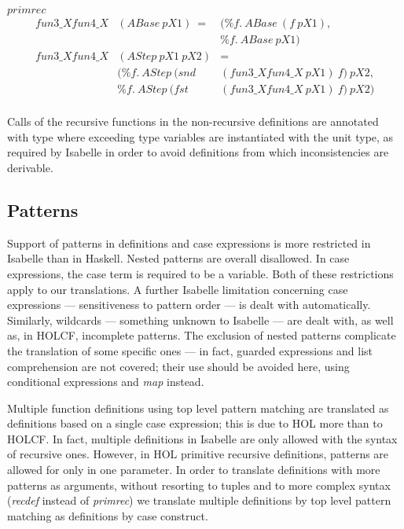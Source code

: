\documentclass[a4paper,12pt]{article}
\begin{document}
\noindent $primrec$ 
$$\begin{array}{lll}
fun3\_Xfun4\_X & (ABase \ pX1) \ = & (\% f. \ ABase \ (f \ pX1), \\
                           &        &  \% f. \ ABase \ pX1) \\
fun3\_Xfun4\_X & (AStep \ pX1 \ pX2) & =  \\
  & (\% f. \ AStep \ (snd & (fun3\_Xfun4\_X \ pX1) \ f) \ pX2, \\
  &  \% f. \ AStep \ (fst & (fun3\_Xfun4\_X \ pX1) \ f) \ pX2) \\
\end{array}$$

\noindent Calls of the recursive functions in the non-recursive
definitions are annotated with type where exceeding type variables are
instantiated with the unit type, as required by Isabelle in order to
avoid definitions from which inconsistencies are derivable.


\subsection{Patterns}
\label{sec:Patterns}

Support of patterns in definitions and case expressions is more
restricted in Isabelle than in Haskell. Nested patterns are overall
disallowed. In case expressions, the case term is required to be a
variable. Both of these restrictions apply to our translations. A
further Isabelle limitation concerning case expressions ---
sensitiveness to pattern order --- is dealt with automatically.
Similarly, wildcards --- something unknown to Isabelle --- are dealt
with, as well as, in HOLCF, incomplete patterns.  The exclusion of
nested patterns complicate the translation of some specific ones ---
in fact, guarded expressions and list comprehension are not covered;
their use should be avoided here, using conditional expressions and
\emph{map} instead.


Multiple function definitions using top level pattern matching are
translated as definitions based on a single case expression; this is
due to HOL more than to HOLCF. In fact, multiple definitions in
Isabelle are only allowed with the syntax of recursive ones. However,
in HOL primitive recursive definitions, patterns are allowed for only
in one parameter. In order to translate definitions with more patterns
as arguments, without resorting to tuples and to more complex syntax
(\emph{recdef} instead of \emph{primrec}) we translate multiple
definitions by top level pattern matching
as definitions by case construct.\\
\end{document}
